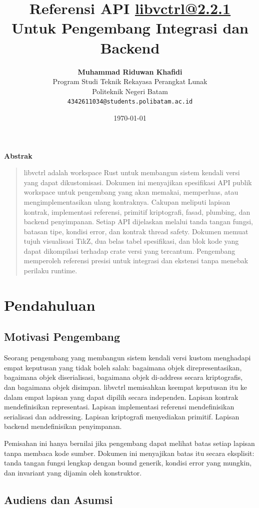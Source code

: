 \documentclass[11pt,a4paper]{article}
\title{\vspace{-1.5cm}\textbf{\sffamily\LARGE Referensi API \href{https://docs.rs/libvctrl/2.2.1}{libvctrl@2.2.1}\\ Untuk Pengembang Integrasi dan Backend}}
\author{
	\textbf{Muhammad Riduwan Khafidi} \\
	\small Program Studi Teknik Rekayasa Perangkat Lunak \\
	\small Politeknik Negeri Batam \\
	\small \texttt{4342611034@students.polibatam.ac.id}
}
\date{\small\today}
\renewenvironment{abstract}
{\small
	\begin{center}\textbf{\sffamily Abstrak}\end{center}
	\begin{quote}}
	{\end{quote}}
\begin{document}
\maketitle
\thispagestyle{empty}

\begin{abstract}
	libvctrl adalah workspace Rust untuk membangun sistem kendali versi yang dapat dikustomisasi. Dokumen ini menyajikan spesifikasi API publik workspace untuk pengembang yang akan memakai, memperluas, atau mengimplementasikan ulang kontraknya. Cakupan meliputi lapisan kontrak, implementasi referensi, primitif kriptografi, fasad, plumbing, dan backend penyimpanan. Setiap API dijelaskan melalui tanda tangan fungsi, batasan tipe, kondisi error, dan kontrak thread safety. Dokumen memuat tujuh visualisasi TikZ, dua belas tabel spesifikasi, dan blok kode yang dapat dikompilasi terhadap crate versi yang tercantum. Pengembang memperoleh referensi presisi untuk integrasi dan ekstensi tanpa menebak perilaku runtime.
\end{abstract}

\section{Pendahuluan}

\subsection{Motivasi Pengembang}

Seorang pengembang yang membangun sistem kendali versi kustom menghadapi empat keputusan yang tidak boleh salah: bagaimana objek direpresentasikan, bagaimana objek diserialisasi, bagaimana objek di-address secara kriptografis, dan bagaimana objek disimpan. libvctrl memisahkan keempat keputusan itu ke dalam empat lapisan yang dapat dipilih secara independen. Lapisan kontrak mendefinisikan representasi. Lapisan implementasi referensi mendefinisikan serialisasi dan addressing. Lapisan kriptografi menyediakan primitif. Lapisan backend mendefinisikan penyimpanan.

Pemisahan ini hanya bernilai jika pengembang dapat melihat batas setiap lapisan tanpa membaca kode sumber. Dokumen ini menyajikan batas itu secara eksplisit: tanda tangan fungsi lengkap dengan bound generik, kondisi error yang mungkin, dan invariant yang dijamin oleh konstruktor.

\subsection{Audiens dan Asumsi}
\end{document}

